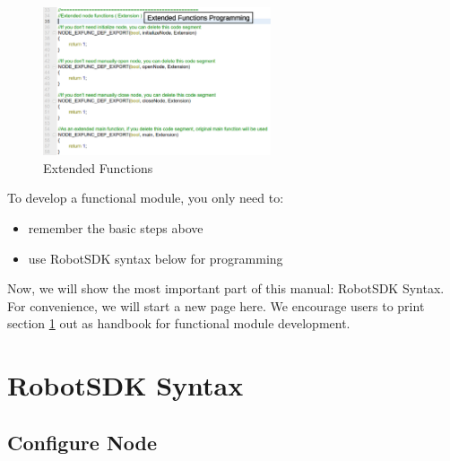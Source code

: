 \documentclass[a4paper,10pt]{book}
\begin{document}
\begin{figure}
 \centering
 \includegraphics[width=0.6\textwidth]{img/source4.eps}
 \caption{Extended Functions}
 \label{fig:source4}
\end{figure}

\vspace{\fill}

\begin{framed}
 To develop a functional module, you only need to:
 \begin{itemize}
  \item remember the basic steps above
  \item use RobotSDK syntax below for programming
 \end{itemize}
 
 Now, we will show the most important part of this manual: RobotSDK Syntax. For convenience, we will start a new page here. We encourage users to print section \ref{syntax} out as handbook for functional module development. 
\end{framed}

\newpage

\section{RobotSDK Syntax}\label{syntax}

\subsection{Configure Node}
\end{document}
